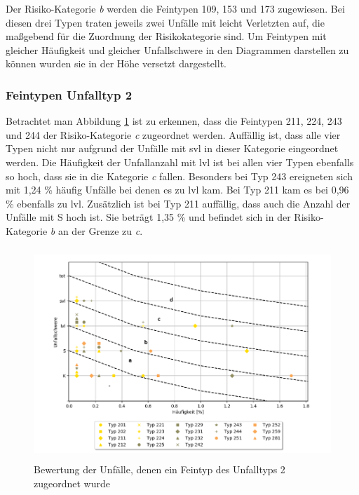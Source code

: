 Der Risiko-Kategorie \textit{b} werden die Feintypen 109, 153 und 173 zugewiesen. Bei diesen drei Typen traten jeweils zwei Unfälle mit leicht Verletzten auf, die maßgebend für die Zuordnung der Risikokategorie sind. Um Feintypen mit gleicher Häufigkeit und gleicher Unfallschwere in den Diagrammen darstellen zu können wurden sie in der Höhe versetzt dargestellt.

\subsubsection{Feintypen Unfalltyp 2}
Betrachtet man Abbildung \ref{fig:Bewertung_FT2} ist zu erkennen, dass die Feintypen 211, 224, 243 und 244 der Risiko-Kategorie \textit{c} zugeordnet werden. Auffällig ist, dass alle vier Typen nicht nur aufgrund der Unfälle mit \ac{svl} in dieser Kategorie eingeordnet werden. Die Häufigkeit der Unfallanzahl mit \ac{lvl} ist bei allen vier Typen ebenfalls so hoch, dass sie in die Kategorie \textit{c} fallen. Besonders bei Typ 243 ereigneten sich mit 1,24 \% häufig Unfälle bei denen es zu \ac{lvl} kam. Bei Typ 211 kam es bei 0,96 \% ebenfalls zu \ac{lvl}. Zusätzlich ist bei Typ 211 auffällig, dass auch die Anzahl der Unfälle mit \ac{S} hoch ist. Sie beträgt 1,35 \% und befindet sich in der Risiko-Kategorie \textit{b} an der Grenze zu \textit{c}.

\begin{savenotes}
	\begin{figure}[H]
		\centering
		\includegraphics[width=12cm,height=8cm]{figures/Bewertung_FT2}
		\caption[Bewertung der Unfälle, denen ein Feintyp des Unfalltyps 2 zugeordnet wurde]{Bewertung der Unfälle, denen ein Feintyp des Unfalltyps 2 zugeordnet wurde}\label{fig:Bewertung_FT2}
	\end{figure}
\end{savenotes}


